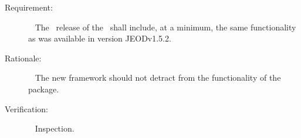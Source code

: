 
%
%
% 
%


\label{reqt:DerivedState_min_func}
\begin{description}
  \item[Requirement:]\ \newline
     The \JEODid\ release of the \DerivedStateDesc\ shall include, at a minimum, the same functionality as was available in version JEODv1.5.2.
  \item[Rationale:]\ \newline
     The new framework should not detract from the functionality of the package.
  \item[Verification:]\ \newline
     Inspection.
\end{description}


